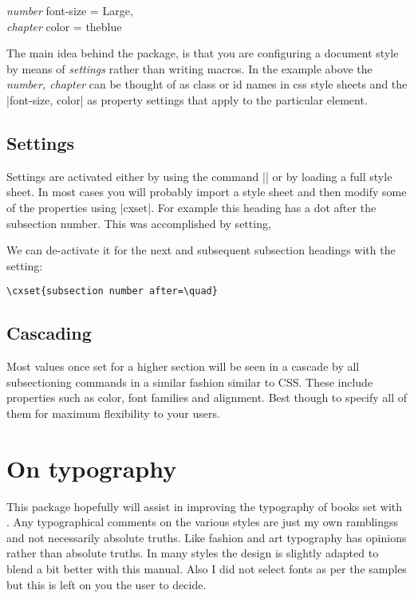 \begin{scriptexample}{}{}
\textit{number} font-size = Large,\\
\textit{chapter} color = theblue
\end{scriptexample}
\smallskip

The main idea behind the package, is that you are configuring a document style by means of \emph{settings} rather than writing macros. In the example above the \emph{number, chapter} can be thought of as class or id names in css style sheets and the |font-size, color| as property settings that apply to the particular element. 


\subsection{Settings}

Settings are activated either by using the command |\cxset|  or by loading a full style sheet. In most cases you will probably import a style sheet and then modify some of the properties using |cxset|.  For example this heading has a dot after the subsection number. This was accomplished by setting,

We can de-activate it for the next and subsequent subsection headings with the setting:

\lorem

\begin{scriptexample}{}{}
\begin{verbatim}
\cxset{subsection number after=\quad}
\end{verbatim}
\end{scriptexample}




\subsection{Cascading}

Most values once set for a higher section will be seen in a cascade by all subsectioning commands in a similar fashion similar to CSS. These include properties such as color, font families and alignment. Best though to specify all of them for maximum flexibility to your users.

\section{On typography}

This package hopefully will assist in improving the typography of books set with \latexe. Any typographical comments on the various styles are just my own ramblingss and not necessarily absolute truths. Like fashion and art typography has opinions rather than absolute truths. In many styles the design is slightly adapted to blend a bit better with this manual. Also I did not select fonts as per the samples but this is left on you the user to decide.



